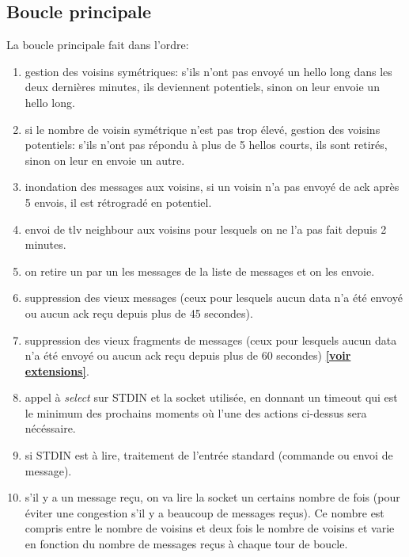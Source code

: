 \documentclass[a4paper,10pt]{article} %
\begin{document}
\subsection{Boucle principale}
La boucle principale fait dans l'ordre:
\begin{enumerate}
\item gestion des voisins symétriques: s'ils n'ont pas envoyé un hello long dans les deux dernières minutes, ils deviennent potentiels, sinon on leur envoie un hello long.
\item si le nombre de voisin symétrique n'est pas trop élevé, gestion des voisins potentiels: s'ils n'ont pas répondu à plus de 5 hellos courts, ils sont retirés, sinon on leur en envoie un autre.
\item inondation des messages aux voisins, si un voisin n'a pas envoyé de ack après 5 envois, il est rétrogradé en potentiel.
\item envoi de tlv neighbour aux voisins pour lesquels on ne l'a pas fait depuis 2 minutes.
\item on retire un par un les messages de la liste de messages et on les envoie.
\item suppression des vieux messages (ceux pour lesquels aucun data n'a été envoyé ou aucun ack reçu depuis plus de 45 secondes).
\item suppression des vieux fragments de messages (ceux pour lesquels aucun data n'a été envoyé ou aucun ack reçu depuis plus de 60 secondes) \hyperref[sec:frag]{\textbf{[voir extensions]}}.
\item appel à \textit{select} sur STDIN et la socket utilisée, en donnant un timeout qui est le minimum des prochains moments où l'une des actions ci-dessus sera nécéssaire.
\item si STDIN est à lire, traitement de l'entrée standard (commande ou envoi de message).
\item s'il y a un message reçu, on va lire la socket un certains nombre de fois (pour éviter une congestion s'il y a beaucoup de messages reçus). Ce nombre est compris entre le nombre de voisins et deux fois le nombre de voisins et varie en fonction du nombre de messages reçus à chaque tour de boucle.
\end{enumerate}
\end{document}
